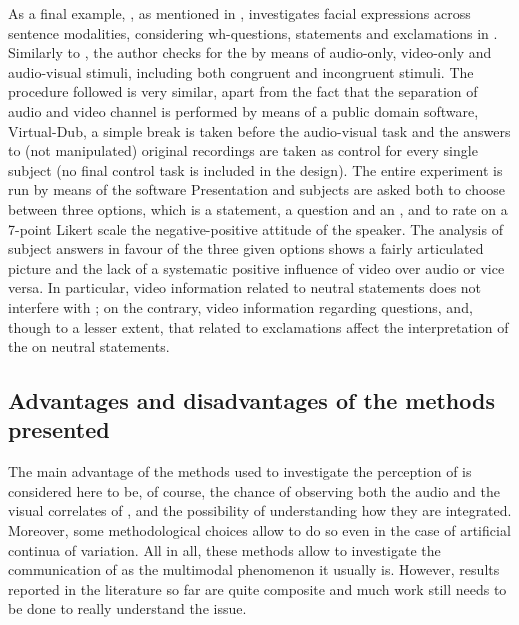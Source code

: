 \documentclass[output=paper]{langsci/langscibook}
\begin{document}
As a final example, \citet{GiliFivela2015informazionimultimodali}, as mentioned in , investigates facial expressions across sentence modalities, considering wh-questions, statements and exclamations in . Similarly to  \citet{CrespoSendra2013}, the author checks for the  by means of audio-only, video-only and audio-visual stimuli, including both congruent and incongruent stimuli. The procedure followed is very similar, apart from the fact that the separation of audio and video channel is performed by means of a public domain software, Virtual-Dub, a simple break is taken before the audio-visual task and the answers to (not manipulated) original recordings are taken as control for every single subject (no final control task is included in the design). The entire experiment is run by means of the software Presentation and subjects are asked both to choose between three options, which is a statement, a question and an , and to rate on a 7-point Likert scale the negative-positive attitude of the speaker. The analysis of subject answers in favour of the three given options shows a fairly articulated picture and the lack of a systematic positive influence of video over audio or vice versa. In particular, video information related to neutral statements does not interfere with ; on the contrary, video information regarding questions, and, though to a lesser extent, that related to exclamations affect the interpretation of the  on neutral statements. 
 
\subsection{Advantages and disadvantages of the methods presented} \label{sec:gil:3:3}
The main advantage of the methods used to investigate the perception of  is considered here to be, of course, the chance of observing both the audio and the visual correlates of , and the possibility of understanding how they are integrated. Moreover, some methodological choices allow to do so even in the case of artificial continua of variation. All in all, these methods allow to investigate the communication of  as the multimodal phenomenon it usually is. However, results reported in the literature so far are quite composite and much work still needs to be done to really understand the issue. 
\end{document}
